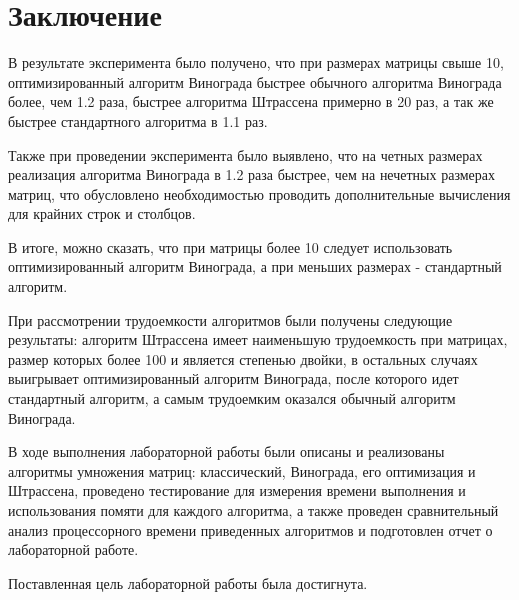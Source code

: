 \chapter*{Заключение}

В результате эксперимента было получено, что при размерах матрицы свыше 10, оптимизированный алгоритм Винограда быстрее обычного алгоритма Винограда более, чем 1.2 раза, быстрее алгоритма Штрассена примерно в 20 раз, а так же быстрее стандартного алгоритма в 1.1 раз. 

Также при проведении эксперимента было выявлено, что на четных размерах реализация алгоритма Винограда в 1.2 раза быстрее, чем на нечетных размерах матриц, что обусловлено необходимостью проводить дополнительные вычисления для крайних строк и столбцов.  

В итоге, можно сказать, что при матрицы более 10 следует использовать оптимизированный алгоритм Винограда, а при меньших размерах - стандартный алгоритм.

При рассмотрении трудоемкости алгоритмов были получены следующие результаты: алгоритм Штрассена имеет наименьшую трудоемкость при матрицах, размер которых более 100 и является степенью двойки, в остальных случаях выигрывает оптимизированный алгоритм Винограда, после которого идет стандартный алгоритм, а самым трудоемким оказался обычный алгоритм Винограда.

В ходе выполнения лабораторной работы были описаны и реализованы алгоритмы умножения матриц: классический, Винограда, его оптимизация и Штрассена, проведено тестирование для измерения времени выполнения и использования помяти для каждого алгоритма, а также проведен сравнительный анализ процессорного времени приведенных алгоритмов и подготовлен отчет о лабораторной работе.

Поставленная цель лабораторной работы была достигнута.
